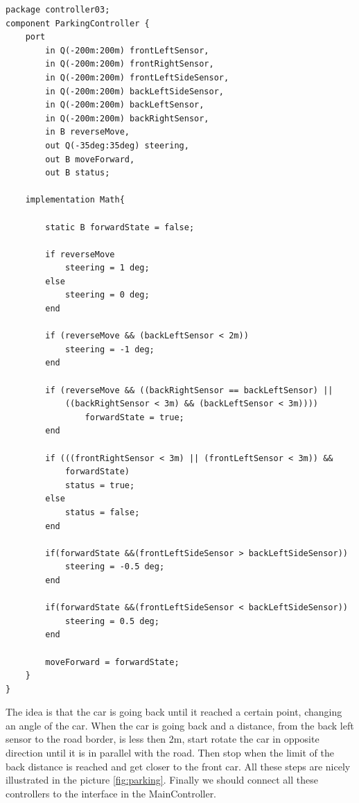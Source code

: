 \begin{lstlisting}
package controller03;
component ParkingController {
    port
        in Q(-200m:200m) frontLeftSensor,
        in Q(-200m:200m) frontRightSensor,
        in Q(-200m:200m) frontLeftSideSensor,
        in Q(-200m:200m) backLeftSideSensor,
        in Q(-200m:200m) backLeftSensor,
        in Q(-200m:200m) backRightSensor,
        in B reverseMove,
        out Q(-35deg:35deg) steering,
        out B moveForward,
        out B status;

    implementation Math{
        
        static B forwardState = false;
        
        if reverseMove
            steering = 1 deg;
        else
            steering = 0 deg;
        end
        
        if (reverseMove && (backLeftSensor < 2m))
            steering = -1 deg;
        end
        
        if (reverseMove && ((backRightSensor == backLeftSensor) ||
            ((backRightSensor < 3m) && (backLeftSensor < 3m))))
                forwardState = true;
        end
        
        if (((frontRightSensor < 3m) || (frontLeftSensor < 3m)) &&
            forwardState)
            status = true;
        else
            status = false; 
        end
        
        if(forwardState &&(frontLeftSideSensor > backLeftSideSensor))
            steering = -0.5 deg;
        end
        
        if(forwardState &&(frontLeftSideSensor < backLeftSideSensor))
            steering = 0.5 deg;
        end
        
        moveForward = forwardState;
    }
}
\end{lstlisting}
\bigskip
The idea is that the car is going back until it reached a certain point, changing an angle of the car. When the car is going back and a distance, from the back left sensor to the road border, is less then 2m, start rotate the car in opposite direction until it is in parallel with the road. Then stop when the limit of the back distance is reached and get closer to the front car. All these steps are nicely illustrated in the picture \ref{fig:parking}. Finally we should connect all these controllers to the interface in the MainController.
\bigskip
